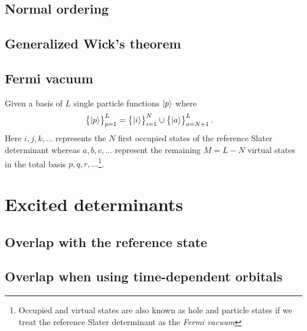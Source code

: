         \subsection{Normal ordering}
        \subsection{Generalized Wick's theorem}
        \subsection{Fermi vacuum}
            \label{sec:fermi-vacuum}
            Given a basis of $L$ single particle functions $\ket{p}$ where
            \begin{align}
                \left\{\ket{p}\right\}_{p = 1}^{L}
                &=
                \left\{\ket{i}\right\}_{i = 1}^{N}
                \cup \left\{\ket{a}\right\}_{a = N + 1}^{L}.
            \end{align}
            Here $i, j, k, \dots$ represents the $N$ first occupied states of
            the reference Slater determinant whereas $a, b, c, \dots$ represent
            the remaining $M = L - N$ virtual states in the total basis $p, q,
            r, \dots$\footnote{Occupied and virtual states are also known as
            hole and particle states if we treat the reference Slater
            determinant as the \textit{Fermi vacuum}}.

    \section{Excited determinants}
        \subsection{Overlap with the reference state}
        \subsection{Overlap when using time-dependent orbitals}

